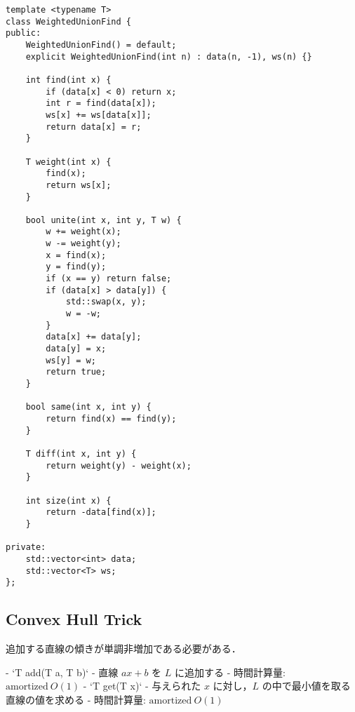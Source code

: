 \begin{lstlisting}
template <typename T>
class WeightedUnionFind {
public:
    WeightedUnionFind() = default;
    explicit WeightedUnionFind(int n) : data(n, -1), ws(n) {}

    int find(int x) {
        if (data[x] < 0) return x;
        int r = find(data[x]);
        ws[x] += ws[data[x]];
        return data[x] = r;
    }

    T weight(int x) {
        find(x);
        return ws[x];
    }

    bool unite(int x, int y, T w) {
        w += weight(x);
        w -= weight(y);
        x = find(x);
        y = find(y);
        if (x == y) return false;
        if (data[x] > data[y]) {
            std::swap(x, y);
            w = -w;
        }
        data[x] += data[y];
        data[y] = x;
        ws[y] = w;
        return true;
    }

    bool same(int x, int y) {
        return find(x) == find(y);
    }

    T diff(int x, int y) {
        return weight(y) - weight(x);
    }

    int size(int x) {
        return -data[find(x)];
    }

private:
    std::vector<int> data;
    std::vector<T> ws;
};
\end{lstlisting}


\subsection{Convex Hull Trick}

\begin{small}
\begin{markdown}
追加する直線の傾きが単調非増加である必要がある．

- `T add(T a, T b)`
    - 直線 $ax + b$ を $L$ に追加する
    - 時間計算量: $\mathrm{amortized}\ O(1)$
- `T get(T x)`
    - 与えられた $x$ に対し，$L$ の中で最小値を取る直線の値を求める
    - 時間計算量: $\mathrm{amortized}\ O(1)$
\end{markdown}
\end{small}

